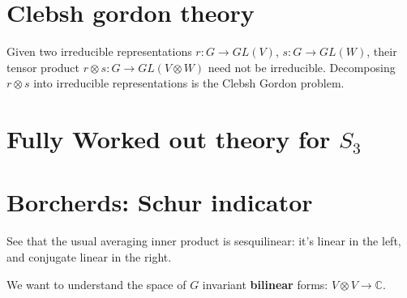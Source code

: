 \documentclass{book}
\newcommand{\C}{\ensuremath{\mathbb{C}}}
\newcommand{\tensor}{\otimes} %
\theoremstyle{definition}
\begin{document}
\chapter{Clebsh gordon theory}
Given two irreducible representations $r: G \rightarrow GL(V)$, $s: G \rightarrow GL(W)$,
their tensor product $r \tensor s: G \rightarrow GL(V \tensor W)$ need not
be irreducible. Decomposing $r \tensor s$ into irreducible representations is
the Clebsh Gordon problem.

\chapter{Fully Worked out theory for $S_3$}

\chapter{Borcherds: Schur indicator}

See that the usual averaging inner product is sesquilinear: it's linear
in the left, and conjugate linear in the right.

We want to understand the space of $G$ invariant \textbf{bilinear} forms: $V \tensor V \rightarrow \C$.
\end{document}
